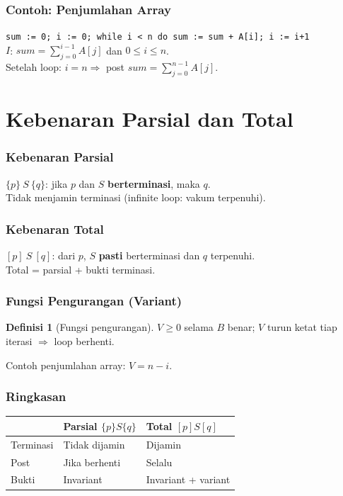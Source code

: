 \documentclass[handout]{beamer}
\theoremstyle{definition}
\newtheorem{definisi}[theorem]{Definisi}
\theoremstyle{example}
\begin{document}
\begin{frame}
\frametitle{Contoh: Penjumlahan Array}
\texttt{sum := 0; i := 0; while i < n do sum := sum + A[i]; i := i+1}\\
$I$: $sum = \sum_{j=0}^{i-1} A[j]$ dan $0 \leq i \leq n$.\\
Setelah loop: $i = n \Rightarrow$ post $sum = \sum_{j=0}^{n-1} A[j]$.
\end{frame}

\section{Kebenaran Parsial dan Total}

\begin{frame}
\frametitle{Kebenaran Parsial}
$\{p\}\ S\ \{q\}$: jika $p$ dan $S$ \textbf{berterminasi}, maka $q$.\\
Tidak menjamin terminasi (infinite loop: vakum terpenuhi).
\end{frame}

\begin{frame}
\frametitle{Kebenaran Total}
$[p]\ S\ [q]$: dari $p$, $S$ \textbf{pasti} berterminasi dan $q$ terpenuhi.\\
Total = parsial + bukti terminasi.
\end{frame}

\begin{frame}
\frametitle{Fungsi Pengurangan (Variant)}
\begin{definisi}[Fungsi pengurangan]
$V \geq 0$ selama $B$ benar; $V$ turun ketat tiap iterasi $\Rightarrow$ loop berhenti.
\end{definisi}
Contoh penjumlahan array: $V = n - i$.
\end{frame}

\begin{frame}
\frametitle{Ringkasan}
\begin{center}
\scriptsize
\begin{tabular}{|l|l|l|}
\hline
 & \textbf{Parsial} $\{p\}S\{q\}$ & \textbf{Total} $[p]S[q]$ \\ \hline
Terminasi & Tidak dijamin & Dijamin \\ \hline
Post & Jika berhenti & Selalu \\ \hline
Bukti & Invariant & Invariant + variant \\ \hline
\end{tabular}
\end{center}
\end{frame}
\end{document}
